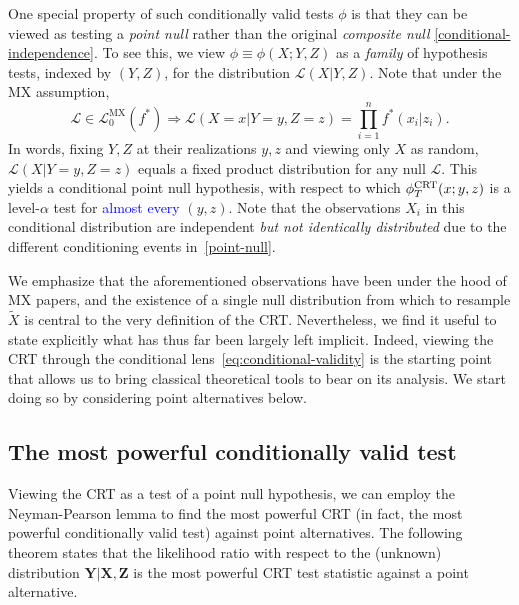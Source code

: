 \documentclass[ejs]{imsart}
\numberwithin{equation}{section}
\theoremstyle{plain}
\theoremstyle{definition}
\theoremstyle{remark}
\newcommand{\prx}{\bm X}
\newcommand{\srx}{X}
\newcommand{\sfx}{x}
\newcommand{\prz}{\bm Z}
\newcommand{\srz}{Z}
\newcommand{\sfz}{z}
\newcommand{\srxk}{\widetilde X}
\newcommand{\pry}{{\bm Y}}
\newcommand{\sry}{Y}
\newcommand{\sfy}{y}
\def\CRT{\textnormal{CRT}}
\begin{document}
One special property of such conditionally valid tests $\phi$ is that they can be viewed as testing a \textit{point null} rather than the original \textit{composite null} \eqref{conditional-independence}. To see this, we view $\phi \equiv \phi(\srx;\sry,\srz)$ as a \textit{family} of hypothesis tests, indexed by $(\sry, \srz)$, for the distribution $\mathcal L(\srx|\sry,\srz)$. Note that under the MX assumption,
\small
\begin{equation}
\mathcal L \in \mathscr L_0^{\text{MX}}(f^*) \Longrightarrow \mathcal L(\srx = \sfx|\sry = \sfy, \srz = \sfz) = \prod_{i = 1}^n  f^*(\sfx_i | \sfz_i).
\label{point-null}
\end{equation}
\normalsize
In words, fixing $Y,Z$ at their realizations $\sfy,\sfz$ and viewing only $\srx$ as random, $\mathcal L(\srx|\sry = \sfy, \srz = \sfz)$ equals a fixed product distribution for any null $\mathcal L$. This yields a conditional point null hypothesis, with respect to which $\phi^{\CRT}_T(\sfx;\sfy,\sfz)$ is a level-$\alpha$ test for \textcolor{blue}{almost every} $(\sfy, \sfz)$. Note that the observations $\srx_i$ in this conditional distribution are independent \textit{but not identically distributed} due to the different conditioning events in~\eqref{point-null}.

\color{blue}
We emphasize that the aforementioned observations have been under the hood of MX papers, and the existence of a single null distribution from which to resample $\srxk$ is central to the very definition of the CRT. Nevertheless, we find it useful to state explicitly what has thus far been largely left implicit. Indeed, viewing the CRT through the conditional lens~\eqref{eq:conditional-validity} is the starting point that allows us to bring classical theoretical tools to bear on its analysis. We start doing so by considering point alternatives below.
\color{black}

\subsection{The most powerful conditionally valid test} \label{sec:NP}

Viewing the CRT as a test of a point null hypothesis, we can employ the  Neyman-Pearson lemma to find the most powerful CRT (in fact, the most powerful conditionally valid test) against point alternatives. The following theorem states that the likelihood ratio with respect to the (unknown) distribution $\pry|\prx, \prz$ is the most powerful CRT test statistic against a point alternative.
\end{document}

